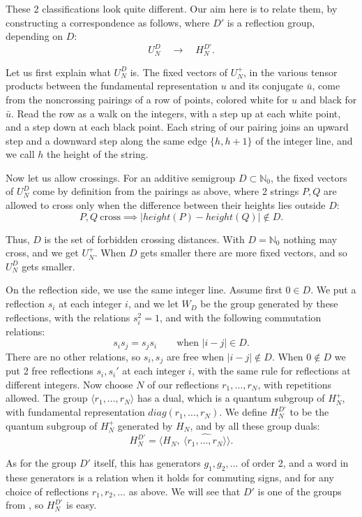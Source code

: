 \documentclass[11pt,a4paper]{article}
\begin{document}
These 2 classifications look quite different. Our aim here is to relate them, by constructing a correspondence as follows, where $D'$ is a reflection group, depending on $D$:
\[
 U_N^D\quad\longrightarrow\quad H_N^{D'}.
\]

Let us first explain what $U_N^D$ is. The fixed vectors of $U_N^+$, in the various tensor products between the fundamental representation $u$ and its conjugate $\bar u$, come from the noncrossing pairings of a row of points, colored white for $u$ and black for $\bar u$. Read the row as a walk on the integers, with a step up at each white point, and a step down at each black point. Each string of our pairing joins an upward step and a downward step along the same edge $\{h,h+1\}$ of the integer line, and we call $h$ the height of the string.

Now let us allow crossings. For an additive semigroup $D\subset\mathbb N_0$, the fixed vectors of $U_N^D$ come by definition from the pairings as above, where 2 strings $P,Q$ are allowed to cross only when the difference between their heights lies outside $D$:
\[
 P,Q\ \text{cross}\implies|height(P)-height(Q)|\notin D.
\]

Thus, $D$ is the set of forbidden crossing distances. With $D=\mathbb N_0$ nothing may cross, and we get $U_N^+$. When $D$ gets smaller there are more fixed vectors, and so $U_N^D$ gets smaller.

On the reflection side, we use the same integer line. Assume first $0\in D$. We put a reflection $s_i$ at each integer $i$, and we let $W_D$ be the group generated by these reflections, with the relations $s_i^2=1$, and with the following commutation relations:
\[
 s_is_j=s_js_i\qquad\text{when }|i-j|\in D.
\]
There are no other relations, so $s_i,s_j$ are free when $|i-j|\notin D$. When $0\notin D$ we put 2 free reflections $s_i,s_i'$ at each integer $i$, with the same rule for reflections at different integers. Now choose $N$ of our reflections $r_1,\ldots,r_N$, with repetitions allowed. The group $\langle r_1,\ldots,r_N\rangle$ has a dual, which is a quantum subgroup of $H_N^+$, with fundamental representation $diag(r_1,\ldots,r_N)$. We define $H_N^{D'}$ to be the quantum subgroup of $H_N^+$ generated by $H_N$, and by all these group duals:
\[
 H_N^{D'}=\Big\langle H_N,\ \widehat{\langle r_1,\ldots,r_N\rangle}\Big\rangle.
\]

As for the group $D'$ itself, this has generators $g_1,g_2,\ldots$ of order 2, and a word in these generators is a relation when it holds for commuting signs, and for any choice of reflections $r_1,r_2,\ldots$ as above. We will see that $D'$ is one of the groups from \cite{rw}, so $H_N^{D'}$ is easy.
\end{document}

